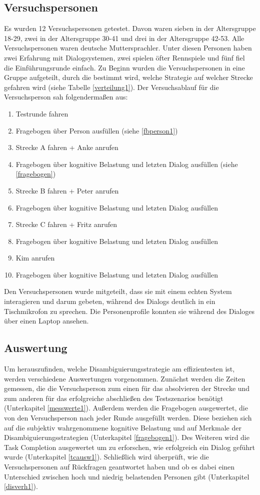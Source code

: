 \documentclass[12pt,a4paper]{scrartcl}
\begin{document}
\subsection{Versuchspersonen}
Es wurden 12 Versuchspersonen getestet. Davon waren sieben in der Altersgruppe 18-29, zwei in der Altersgruppe 30-41 und drei in der Altersgruppe 42-53. Alle Versuchspersonen waren deutsche Muttersprachler. Unter diesen Personen haben zwei Erfahrung mit Dialogsystemen, zwei spielen öfter Rennspiele und fünf fiel die Einführungsrunde einfach. Zu Beginn wurden die Versuchspersonen in eine Gruppe aufgeteilt, durch die bestimmt wird, welche Strategie auf welcher Strecke gefahren wird (siehe Tabelle \ref{verteilung1}).
Der Versuchsablauf für die Versuchsperson sah folgendermaßen aus:
\begin{enumerate}
\item Testrunde fahren
\item Fragebogen über Person ausfüllen (siehe \ref{fbperson1})
\item Strecke A fahren + Anke anrufen
\item Fragebogen über kognitive Belastung und letzten Dialog ausfüllen (siehe \ref{fragebogen})
\item Strecke B fahren + Peter anrufen
\item Fragebogen über kognitive Belastung und letzten Dialog ausfüllen
\item Strecke C fahren + Fritz anrufen
\item Fragebogen über kognitive Belastung und letzten Dialog ausfüllen 
\item Kim anrufen
\item Fragebogen über kognitive Belastung und letzten Dialog ausfüllen 
\end{enumerate}

Den Versuchspersonen wurde mitgeteilt, dass sie mit einem echten System interagieren und darum gebeten, während des Dialogs deutlich in ein Tischmikrofon zu sprechen. Die Personenprofile konnten sie während des Dialoges über einen Laptop ansehen.

\subsection{Auswertung}
\label{auswertung1}
Um herauszufinden, welche Disambiguierungsstrategie am effizientesten ist, werden verschiedene Auswertungen vorgenommen. 
Zunächst werden die Zeiten gemessen, die die Versuchsperson zum einen für das absolvieren der Strecke und zum anderen für das erfolgreiche abschließen des Testszenarios benötigt (Unterkapitel \ref{messwerte1}).
Außerdem werden die Fragebogen ausgewertet, die von den Versuchsperson nach jeder Runde ausgefüllt werden. Diese beziehen sich auf die subjektiv wahrgenommene kognitive Belastung und auf Merkmale der Disambiguierungsstrategien (Unterkapitel \ref{fragebogen1}). Des Weiteren wird die Task Completion ausgewertet um zu erforschen, wie erfolgreich ein Dialog geführt wurde (Unterkapitel \ref{tcausw1}). Schließlich wird überprüft, wie die Versuchspersonen auf Rückfragen geantwortet haben und ob es dabei einen Unterschied zwischen hoch und niedrig belastenden Personen gibt (Unterkapitel \ref{disverh1}). 
\end{document}
